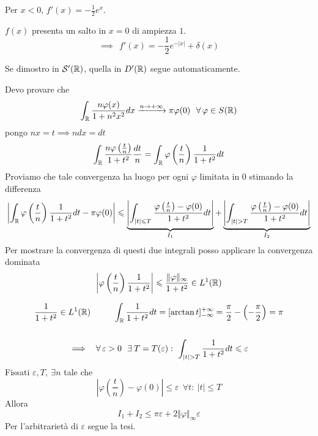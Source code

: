 Per $x < 0$, $f'(x) = - \frac{1}{2} e^{x}$.

$f(x)$ presenta un salto in $x = 0$ di ampiezza $1$.
\begin{equation*}
\implies \ \ f'(x) = - \frac{1}{2} e^{ - | x| } + \delta (x)
\end{equation*}
\Soluzione


Se dimostro in $\mathcal{S}  '(\mathbb{R})$, quella in $D'(\mathbb{R})$ segue automaticamente.

Devo provare che
\begin{equation*}
\int _{\RR }\frac{n\varphi (x)}{1 + n^{2} x^{2}} dx\xrightarrow{n\rightarrow + \infty } \pi \varphi (0) \ \ \forall \varphi \in S(\RR)
\end{equation*}
pongo $nx = t\implies ndx = dt$
\begin{equation*}
\int _{\mathbb{R} }\frac{n\varphi \left(\frac{t}{n}\right)}{1 + t^{2}}\frac{dt}{n} = \int _{\mathbb{R} } \varphi \left(\frac{t}{n}\right)\frac{1}{1 + t^{2}} dt
\end{equation*}
Proviamo che tale convergenza ha luogo per ogni $\varphi $ limitata in $0$ stimando la differenza
\begin{equation*}
\left| \int _{\mathbb{R} } \varphi \left(\frac{t}{n}\right)\frac{1}{1 + t^{2}} dt - \pi \varphi (0)\right| \leqslant \underbrace{\left| \int _{| t| \leqslant T}\frac{\varphi \left(\frac{t}{n}\right) - \varphi (0)}{1 + t^{2}} dt\right| }_{I_{1}} + \underbrace{\left| \int _{| t|  > T}\frac{\varphi \left(\frac{t}{n}\right) - \varphi (0)}{1 + t^{2}} dt\right| }_{I_{2}}
\end{equation*}
Per mostrare la convergenza di questi due integrali posso applicare la convergenza dominata
\begin{equation*}
\left| \varphi \left(\frac{t}{n}\right)\frac{1}{1 + t^{2}}\right| \leqslant \frac{\Vert \varphi \Vert _{\infty }}{1 + t^{2}} \in L^{1}(\mathbb{R})
\end{equation*}
\begin{rem}
\begin{gather*}
\frac{1}{1 + t^{2}} \in L^{1}(\RR) \ \ \ \ \ \ \ \ \int _{\RR }\frac{1}{1 + t^{2}} dt = [\arctan t]^{ + \infty }_{ - \infty } = \frac{\pi }{2} - \left(- \frac{\pi }{2}\right) = \pi \\
\\
\implies \ \ \forall \varepsilon  > 0\ \ \exists T = T(\varepsilon) :\ \int _{| t|  > T}\frac{1}{1 + t^{2}} dt\leqslant \varepsilon 
\end{gather*}
Fissati $\varepsilon ,T,\ \exists n$ tale che
\begin{equation*}
\left| \varphi \left(\frac{t}{n}\right) - \varphi (0)\right| \leqslant \varepsilon \ \ \forall t:\ | t| \leqslant T
\end{equation*}
Allora
\begin{equation*}
I_{1} + I_{2} \leqslant \pi \varepsilon + 2\Vert \varphi \Vert _{\infty } \varepsilon 
\end{equation*}
Per l'arbitrarietà di $\varepsilon $ segue la tesi.
\end{rem}
\Soluzione


